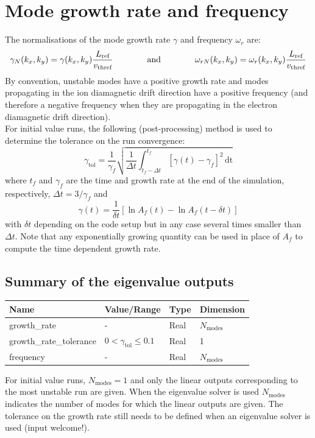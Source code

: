 \documentclass[a4paper]{report}
\begin{document}
\section{Mode growth rate and frequency}
The normalisations of the mode growth rate $\gamma$ and frequency $\omega_r$ are:
\begin{equation}
 \gamma_N(k_x,k_y) = \gamma(k_x,k_y) \frac{L_{\textrm{ref}}}{v_\textrm{thref}} \qquad \qquad \textrm{and} \qquad \qquad \omega_{rN}(k_x,k_y) = \omega_r(k_x,k_y) \frac{L_{\textrm{ref}}}{v_\textrm{thref}}
\end{equation}
By convention, unstable modes have a positive growth rate and modes propagating in the ion diamagnetic drift direction have a positive frequency (and therefore a negative frequency when they are propagating in the electron diamagnetic drift direction).\\

For initial value runs, the following (post-processing) method is used to determine the tolerance on the run convergence:
$$\gamma_\textrm{tol} = \frac{1}{\gamma_f}\sqrt{\frac{1}{\Delta t}\int_{t_f-\Delta t}^{t_f} \left[\gamma(t)-\gamma_f\right]^2\,\textrm{dt}}$$
where $t_f$ and $\gamma_f$ are the time and growth rate at the end of the simulation, respectively, $\Delta t = 3/\gamma_f$ and
$$\gamma(t)=\frac{1}{\delta t}[\ln{A_f(t)}-\ln{A_f(t-\delta t)}]$$
with $\delta t$ depending on the code setup but in any case several times smaller than $\Delta t$. Note that any exponentially growing quantity can be used in place of $A_f$ to compute the time dependent growth rate.

\subsection{Summary of the eigenvalue outputs}
\begin{tabularx}{\textwidth}{|X|Y|Y|Y|}
\hline
Name & Value/Range & Type & Dimension \\
\hline
growth\_rate & - & Real & $N_\textrm{modes}$ \\
growth\_rate\_tolerance & $0<\gamma_\textrm{tol}\leq 0.1$ & Real & 1 \\
frequency & - & Real & $N_\textrm{modes}$ \\
\hline
\end{tabularx}
For initial value runs, $N_\textrm{modes}=1$ and only the linear outputs corresponding to the most unstable run are given. When the eigenvalue solver is used $N_\textrm{modes}$ indicates the number of modes for which the linear outputs are given. The tolerance on the growth rate still needs to be defined when an eigenvalue solver is used (input welcome!).
\end{document}
